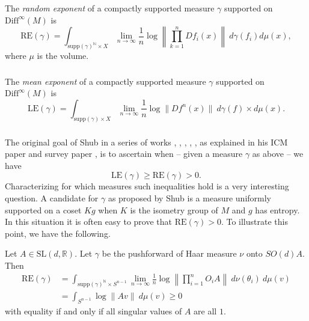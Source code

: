 \documentclass[10pt]{amsart}
\numberwithin{equation}{section}     %
\newcommand{\N}{\mathbb{N}} \newcommand{\Z}{\mathbb{Z}} \newcommand{\Q}{\mathbb{Q}} \newcommand{\R}{\mathbb{R}}
\newcommand{\SL}{\mathrm{SL}}
\newcommand{\Diff}{\mathrm{Diff}}
\begin{document}
\subsubsection{} The \textit{random exponent} of a compactly supported measure $\gamma$ supported on $\Diff^\infty(M)$ is $$\text{RE}(\gamma) = \int_{\mathrm{supp}(\gamma)^{\N} \times X} \lim \limits_{n\to\infty} \frac{1}{n}\log \left \| \prod \limits_{k=1}^n Df_i (x) \right \| \ d\gamma(f_i) d\mu(x),$$ where $\mu$ is the volume. 

\subsubsection{} The \textit{mean exponent}  of a compactly supported measure $\gamma$ supported on $\Diff^\infty(M)$ is $$\text{LE}(\gamma) = \int_{\mathrm{supp}(\gamma) \times X} \lim \limits_{n \to \infty} \frac{1}{n} \log \|Df^n(x)\| \ d\gamma(f) \times d \mu(x).$$

\subsubsection{}

The original goal of Shub in a series of works \cite{dedieu2003mike}, \cite{ledrappier2003random}, \cite{pujals2006expanding}, \cite{pujals2008dynamics}, \cite{dLL2008entropy}, \cite{armentanorandom} as explained in his ICM paper \cite{shub2006all} and survey paper \cite{burns2001recent}, is to ascertain when -- given a measure $\gamma$ as above -- we have \begin{equation}
    \text{LE}(\gamma) \geq \text{RE}(\gamma) > 0. \label{inequality}
\end{equation} Characterizing for which measures such inequalities hold is a very interesting question. A candidate for $\gamma$ as proposed by Shub is a measure uniformly supported on a coset $Kg$ when $K$ is the isometry group of $M$ and $g$ has entropy. In this situation it is often easy to prove that $\text{RE}(\gamma) > 0$. To illustrate this point, we have the following. 

\begin{proposition}
    Let $A \in \SL(d,\R)$. Let $\gamma$ be the pushforward of Haar measure $\nu$ onto $SO(d)A$. Then \begin{align*}
       \mathrm{RE}(\gamma) &= \int_{\mathrm{supp}(\gamma)^\N \times S^{n-1} } \lim \limits_{n \to \infty} \frac{1}{n} \log \left\| \prod \limits_{i=1}^n O_i A \right\| \ d\nu(\theta_i) \ d\mu(v)\\
       &=
       \int_{S^{n-1}} \log \|Av\| \ d\mu(v)  \geq 0 
    \end{align*}  with equality if and only if all singular values of $A$ are all $1$. 
\end{proposition}
\end{document}
